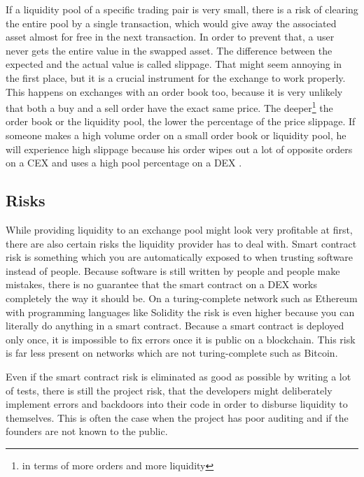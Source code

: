 If a liquidity pool of a specific trading pair is very small, there is a risk of clearing the entire pool by a single transaction, which would give away the associated asset almost for free in the next transaction. In order to prevent that, a user never gets the entire value in the swapped asset. The difference between the expected and the actual value is called slippage. That might seem annoying in the first place, but it is a crucial instrument for the exchange to work properly. This happens on exchanges with an order book too, because it is very unlikely that both a buy and a sell order have the exact same price. The deeper\footnote{in terms of more orders and more liquidity} the order book or the liquidity pool, the lower the percentage of the price slippage. If someone makes a high volume order on a small order book or liquidity pool, he will experience high slippage because his order wipes out a lot of opposite orders on a CEX and uses a high pool percentage on a DEX \cite{Hosp2020}.

\subsection{Risks}
While providing liquidity to an exchange pool might look very profitable at first, there are also certain risks the liquidity provider has to deal with. Smart contract risk is something which you are automatically exposed to when trusting software instead of people. Because software is still written by people and people make mistakes, there is no guarantee that the smart contract on a DEX works completely the way it should be. On a turing-complete network such as Ethereum with programming languages like Solidity the risk is even higher because you can literally do anything in a smart contract. Because a smart contract is deployed only once, it is impossible to fix errors once it is public on a blockchain. This risk is far less present on networks which are not turing-complete such as Bitcoin.

Even if the smart contract risk is eliminated as good as possible by writing a lot of tests, there is still the project risk, that the developers might deliberately implement errors and backdoors into their code in order to disburse liquidity to themselves. This is often the case when the project has poor auditing and if the founders are not known to the public.


